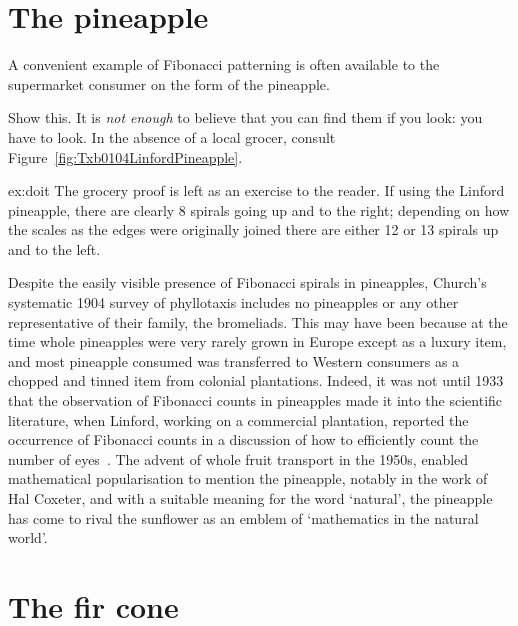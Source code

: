  \section{The pineapple}
A convenient example of Fibonacci patterning is often available to the supermarket consumer on the form of the pineapple.
\begin{jExercise}
	\label{ex:doit}
	Show this.  It is \emph{not enough} to believe that you can find them if you look: you have to look. In the absence of a local grocer, consult Figure~\ref{fig:Txb0104LinfordPineapple}.
\end{jExercise}
\begin{jAnswer}{ex:doit}
	The grocery proof is left as an exercise to the reader. If using the Linford pineapple, there are clearly 8 spirals going up and to the right; depending on how the scales as the edges were originally joined there are either 12 or 13 spirals up and to the left. 
\end{jAnswer} 
Despite the easily visible presence of Fibonacci spirals in pineapples, Church's systematic 1904 survey of phyllotaxis includes no pineapples or any other representative of their family, the bromeliads. This may have been because at the time whole pineapples were very rarely grown in Europe except as a luxury item, and most pineapple consumed was transferred to Western consumers as a chopped and tinned item from colonial plantations. Indeed, it was not until 1933 that the observation of Fibonacci counts in pineapples made it into the scientific literature, when Linford, working on a commercial plantation, reported the occurrence of Fibonacci counts in a discussion of how to efficiently count the number of eyes~\cite{linfordFruitQualityStudies1933}. The advent of whole fruit transport in the 1950s, enabled  mathematical popularisation to mention the pineapple, notably in the work of Hal Coxeter, and with a suitable meaning for the word `natural',  the pineapple has come to rival the sunflower as an emblem of `mathematics in the natural world'.

 
\section{The fir cone}

